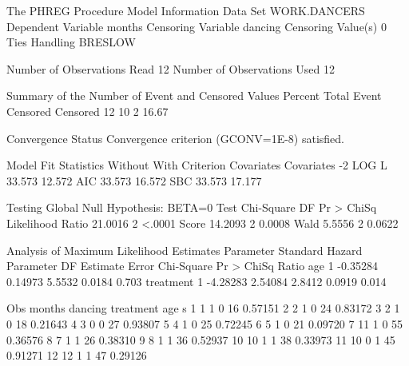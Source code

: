 \documentclass{article}
\begin{document}
\begin{Woutput}
The PHREG Procedure
          Model Information
Data Set                 WORK.DANCERS
Dependent Variable       months
Censoring Variable       dancing
Censoring Value(s)       0
Ties Handling            BRESLOW

Number of Observations Read          12
Number of Observations Used          12

Summary of the Number of Event and Censored Values
                                     Percent
   Total       Event    Censored    Censored
      12          10           2       16.67

                       Convergence Status
         Convergence criterion (GCONV=1E-8) satisfied.

         Model Fit Statistics
                 Without           With
Criterion     Covariates     Covariates
-2 LOG L          33.573         12.572
AIC               33.573         16.572
SBC               33.573         17.177

        Testing Global Null Hypothesis: BETA=0
Test                 Chi-Square       DF     Pr > ChiSq
Likelihood Ratio        21.0016        2         <.0001
Score                   14.2093        2         0.0008
Wald                     5.5556        2         0.0622

                     Analysis of Maximum Likelihood Estimates
                    Parameter      Standard                                  Hazard
Parameter    DF      Estimate         Error    Chi-Square    Pr > ChiSq       Ratio
age           1      -0.35284       0.14973        5.5532        0.0184       0.703
treatment     1      -4.28283       2.54084        2.8412        0.0919       0.014

Obs    months    dancing    treatment    age       s
  1       1         1           0         16    0.57151
  2       2         1           0         24    0.83172
  3       2         1           0         18    0.21643
  4       3         0           0         27    0.93807
  5       4         1           0         25    0.72245
  6       5         1           0         21    0.09720
  7      11         1           0         55    0.36576
  8       7         1           1         26    0.38310
  9       8         1           1         36    0.52937
 10      10         1           1         38    0.33973
 11      10         0           1         45    0.91271
 12      12         1           1         47    0.29126
\end{Woutput}
\end{document}
